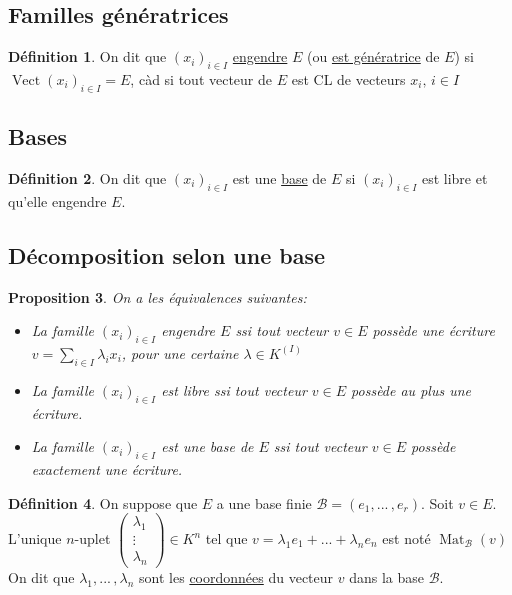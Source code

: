 \documentclass[10pt,a4paper]{article}
\theoremstyle{plain}
\newtheorem{proposition}{Proposition}[section]
\theoremstyle{definition}
\newtheorem{definition}[proposition]{Définition}
\DeclareMathOperator{\vect}{Vect}
\DeclareMathOperator{\mat}{Mat}
\begin{document}
\subsection{Familles génératrices}
\begin{definition}
On dit que $(x_i)_{i \in I}$ \uline{engendre} $E$ (ou \uline{est génératrice} de $E$) si $\vect(x_i)_{i \in I} = E$, càd si tout vecteur de $E$ est CL de vecteurs $x_i,\, i \in I$
\end{definition}

\subsection{Bases}
\begin{definition}
On dit que $(x_i)_{i \in I}$ est une \uline{base} de $E$ si $(x_i)_{i \in I}$ est libre et qu'elle engendre $E$.
\end{definition}

\subsection{Décomposition selon une base}
\begin{proposition}
On a les équivalences suivantes:
\begin{itemize}
\item La famille $(x_i)_{i \in I}$ engendre $E$ ssi tout vecteur $v \in E$ possède une écriture $v = \sum\limits_{i \in I} \lambda_i x_i$, pour une certaine $\lambda \in K^{(I)}$
\item La famille $(x_i)_{i \in I}$ est libre ssi tout vecteur $v \in E$ possède au plus une écriture.
\item La famille $(x_i)_{i \in I}$ est une base de $E$ ssi tout vecteur $v \in E$ possède exactement une écriture.
\end{itemize}
\end{proposition}
\begin{definition}
On suppose que $E$ a une base finie $\mathcal{B} = (e_1, ...\, , e_r)$. Soit $v \in E$. \\
L'unique $n$-uplet $\begin{pmatrix}
\lambda_1 \\
\vdots \\
\lambda_n
\end{pmatrix} \in K^n$ tel que $v = \lambda_1 e_1 + ... + \lambda_n e_n$ est noté $\mat_\mathcal{B}(v)$ \\
On dit que $\lambda_1, ...\, , \lambda_n$ sont les \uline{coordonnées} du vecteur $v$ dans la base $\mathcal{B}$.
\end{definition}
\end{document}
